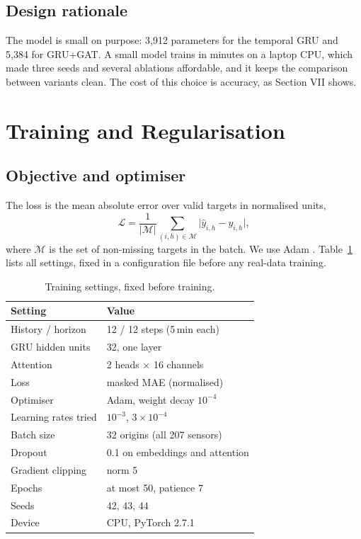 \documentclass[conference]{IEEEtran}
\begin{document}
\subsection{Design rationale}
The model is small on purpose: 3,912 parameters for the temporal GRU and 5,384 for GRU+GAT. A small model trains in minutes on a laptop CPU, which made three seeds and several ablations affordable, and it keeps the comparison between variants clean. The cost of this choice is accuracy, as Section VII shows.

\section{Training and Regularisation}
\subsection{Objective and optimiser}
The loss is the mean absolute error over valid targets in normalised units,
\begin{equation}
\mathcal L=\frac{1}{|\mathcal M|}\sum_{(i,h)\in\mathcal M}\bigl|\hat y_{i,h}-y_{i,h}\bigr|,
\end{equation}
where $\mathcal M$ is the set of non-missing targets in the batch. We use Adam \cite{adam}. Table~\ref{tab:hyper} lists all settings, fixed in a configuration file before any real-data training.

\begin{table}[t]\centering\small
\caption{Training settings, fixed before training.}\label{tab:hyper}
\begin{tabular}{@{}ll@{}}\toprule
Setting & Value\\\midrule
History / horizon & 12 / 12 steps (5\,min each)\\
GRU hidden units & 32, one layer\\
Attention & 2 heads $\times$ 16 channels\\
Loss & masked MAE (normalised)\\
Optimiser & Adam, weight decay $10^{-4}$\\
Learning rates tried & $10^{-3}$, $3\times10^{-4}$\\
Batch size & 32 origins (all 207 sensors)\\
Dropout & 0.1 on embeddings and attention\\
Gradient clipping & norm 5\\
Epochs & at most 50, patience 7\\
Seeds & 42, 43, 44\\
Device & CPU, PyTorch 2.7.1\\
\bottomrule\end{tabular}
\end{table}
\end{document}
